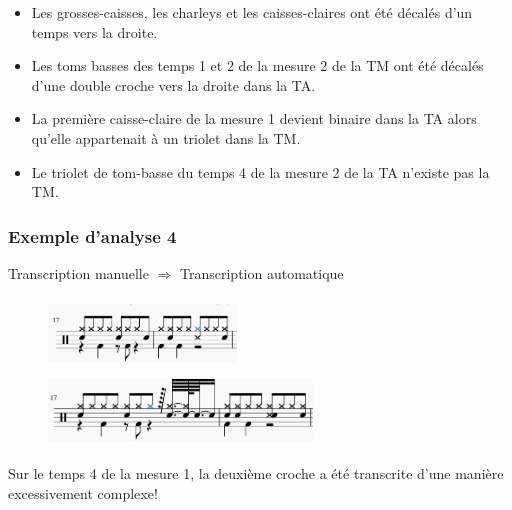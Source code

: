 \begin{itemize}
	\item Les grosses-caisses, les charleys et les caisses-claires ont été
        décalés d’un temps vers la droite.
	\item Les toms basses des temps 1 et 2 de la mesure 2 de la TM ont été
        décalés d’une double croche vers la droite dans la TA.
	\item La première caisse-claire de la mesure 1 devient binaire dans la TA
        alors qu’elle appartenait à un triolet dans la TM.
	\item Le triolet de tom-basse du temps 4 de la mesure 2 de la TA n’existe
        pas la TM.\\
\end{itemize}

\subsubsection{Exemple d’analyse 4}
\tab \tab Transcription manuelle $\Rightarrow$ Transcription automatique
\begin{figure}[h]
\centering
\includegraphics[height=19mm, width=50mm]{
z_images/4_experimentations/1_analyses/1_drummer1_session1/3_manuelle.png}
\ \ \ \ 
\includegraphics[height=19mm, width=70mm]{
z_images/4_experimentations/1_analyses/1_drummer1_session1/2_musescore.png}
\end{figure}

Sur le temps 4 de la mesure 1, la deuxième croche a été transcrite d’une
manière excessivement complexe!

